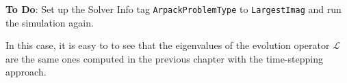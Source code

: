 \documentclass[a4paper,12pt]{article}
\begin{document}
\vspace{0.5cm}
\textbf{To Do}: Set up the Solver Info tag \texttt{ArpackProblemType} to \texttt{LargestImag} and run the simulation again.


In this case, it is easy to to see that the eigenvalues of the evolution operator $\mathcal{L}$ are the same ones computed in the previous chapter with the time-stepping approach.

\begin{equation}
\end{equation}
\clearpage
\end{document}
